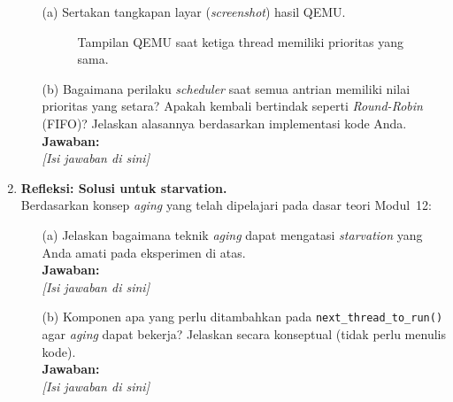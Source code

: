 \begin{enumerate}
	      \begin{enumerate}
		      \item[(a)] Sertakan tangkapan layar (\textit{screenshot}) hasil QEMU.

		            \begin{figure}[H]
			            \centering
			            \caption{Tampilan QEMU saat ketiga thread memiliki prioritas yang sama.}
		            \end{figure}

		      \item[(b)] Bagaimana perilaku \textit{scheduler} saat semua antrian memiliki nilai prioritas yang setara? Apakah kembali bertindak seperti \textit{Round-Robin} (FIFO)? Jelaskan alasannya berdasarkan implementasi kode Anda.\\[0.2cm]
		            \textbf{Jawaban:}\\
		            \textit{[Isi jawaban di sini]}
	      \end{enumerate}

	\item \textbf{Refleksi: Solusi untuk starvation.}\\
	      Berdasarkan konsep \textit{aging} yang telah dipelajari pada dasar teori Modul~12:
	      \begin{enumerate}
		      \item[(a)] Jelaskan bagaimana teknik \textit{aging} dapat mengatasi \textit{starvation} yang Anda amati pada eksperimen di atas.\\[0.2cm]
		            \textbf{Jawaban:}\\
		            \textit{[Isi jawaban di sini]}
		      \item[(b)] Komponen apa yang perlu ditambahkan pada \texttt{next\_thread\_to\_run()} agar \textit{aging} dapat bekerja? Jelaskan secara konseptual (tidak perlu menulis kode).\\[0.2cm]
		            \textbf{Jawaban:}\\
		            \textit{[Isi jawaban di sini]}
	      \end{enumerate}

\end{enumerate}